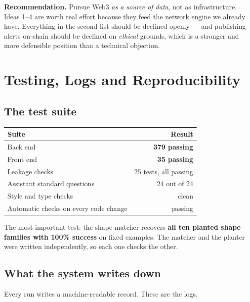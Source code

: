 \documentclass[11pt,a4paper]{article}
\begin{document}
\begin{keybox}
\textbf{Recommendation.} Pursue Web3 \emph{as a source of data}, not as
infrastructure. Ideas 1--4 are worth real effort because they feed the network
engine we already have. Everything in the second list should be declined openly
--- and publishing alerts on-chain should be declined on \emph{ethical} grounds,
which is a stronger and more defensible position than a technical objection.
\end{keybox}

\section{Testing, Logs and Reproducibility}

\subsection{The test suite}

\begin{center}\small
\begin{tabular}{@{}lr@{}}
\toprule
\textbf{Suite} & \textbf{Result} \\
\midrule
Back end & \textbf{379 passing} \\
Front end & \textbf{35 passing} \\
Leakage checks & 25 tests, all passing \\
Assistant standard questions & 24 out of 24 \\
Style and type checks & clean \\
Automatic checks on every code change & passing \\
\bottomrule
\end{tabular}
\end{center}

The most important test: the shape matcher recovers \textbf{all ten planted shape
families with 100\% success} on fixed examples. The matcher and the planter were
written independently, so each one checks the other.

\subsection{What the system writes down}

Every run writes a machine-readable record. These are the logs.
\end{document}
